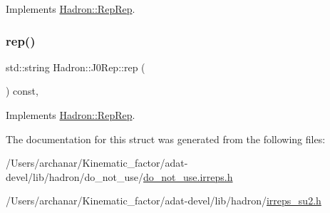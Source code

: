 Implements \mbox{\hyperlink{structHadron_1_1RepRep_ab3213025f6de249f7095892109575fde}{Hadron\+::\+Rep\+Rep}}.

\mbox{\label{structHadron_1_1J0Rep_a357214188122dd0e69716a4f7ff098b1}} 
\subsubsection{\texorpdfstring{rep()}{rep()}\hspace{0.1cm}{\footnotesize\ttfamily [5/5]}}
{\footnotesize\ttfamily std\+::string Hadron\+::\+J0\+Rep\+::rep (\begin{DoxyParamCaption}{ }\end{DoxyParamCaption}) const\hspace{0.3cm}{\ttfamily [inline]}, {\ttfamily [virtual]}}



Implements \mbox{\hyperlink{structHadron_1_1RepRep_ab3213025f6de249f7095892109575fde}{Hadron\+::\+Rep\+Rep}}.



The documentation for this struct was generated from the following files\+:\begin{DoxyCompactItemize}
\item 
/\+Users/archanar/\+Kinematic\+\_\+factor/adat-\/devel/lib/hadron/do\+\_\+not\+\_\+use/\mbox{\hyperlink{adat-devel_2lib_2hadron_2do__not__use_2do__not__use_8irreps_8h}{do\+\_\+not\+\_\+use.\+irreps.\+h}}\item 
/\+Users/archanar/\+Kinematic\+\_\+factor/adat-\/devel/lib/hadron/\mbox{\hyperlink{adat-devel_2lib_2hadron_2irreps__su2_8h}{irreps\+\_\+su2.\+h}}\end{DoxyCompactItemize}
